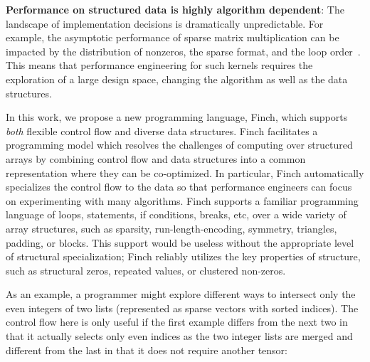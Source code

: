 \textbf{Performance on structured data is highly algorithm dependent}: The landscape of implementation decisions is dramatically unpredictable. 
%
For example, the asymptotic performance of sparse matrix multiplication can be impacted by the distribution of nonzeros, the sparse format, and the loop order~\cite{ahrens2022autoscheduling, zhang2021gamma}. 
This means that performance engineering for such kernels requires the exploration of a large design space, changing the algorithm as well as the data structures.



In this work, we propose a new programming language, Finch, which supports \textit{both} flexible control flow and diverse data structures.
%
Finch facilitates a programming model which resolves the challenges of computing over structured arrays by combining control flow and data structures into a common representation where they can be co-optimized.
%
In particular, Finch automatically specializes the control flow to the data so that performance engineers can focus on experimenting with many algorithms.
%
Finch supports a familiar programming language of loops, statements, if conditions, breaks, etc, over a wide variety of array structures, such as sparsity, run-length-encoding, symmetry, triangles, padding, or blocks. 
%
This support would be useless without the appropriate level of structural specialization; Finch reliably utilizes the key properties of structure, such as structural zeros, repeated values, or clustered non-zeros.
%

As an example, a programmer might explore different ways to intersect only the even integers of two lists (represented as sparse vectors with sorted indices). The control flow here is only useful if the first example differs from the next two in that it actually selects only even indices as the two integer lists are merged and different from the last in that it does not require another tensor:

